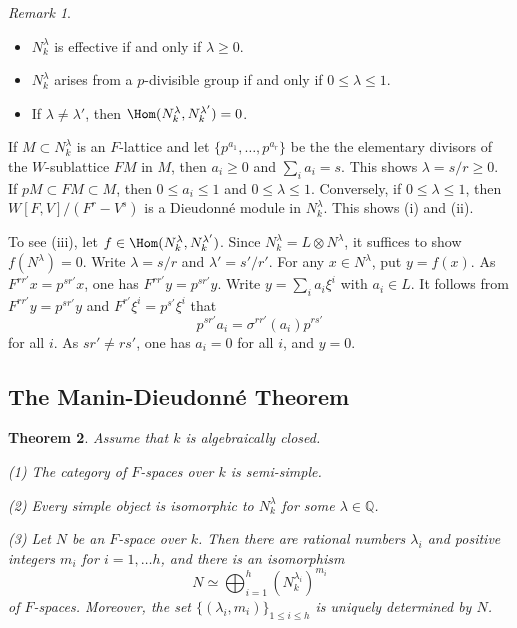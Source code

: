 \documentclass[]{amsart}
\theoremstyle{plain}
\newtheorem{thm}{Theorem}
\theoremstyle{definition}
\theoremstyle{remark}
\newtheorem{remark}[thm]{Remark}
\newcommand{\Q}{\mathbb Q}
\newcommand{\<}{\langle}   %
\renewcommand{\>}{\rangle} %
\newcommand{\dieu}{Dieudonn\'{e} }
\begin{document}
\begin{remark}\label{rem:26} \ 

\begin{itemize}
    \item[(i)] $N^\lambda_k$ is effective if and only if $\lambda\ge 0$.
    \item[(ii)] $N^\lambda_k$ arises from a $p$-divisible group if and only if $0\le \lambda \le 1$.
    \item[(iii)] If $\lambda\neq \lambda'$, then $\Hom(N^\lambda_k, N^{\lambda'}_k)=0$.    
\end{itemize}
If $M\subset N^\lambda_k$ is an $F$-lattice and let $\{p^{a_1}, \dots, p^{a_r}\}$ be the the elementary divisors of the $W$-sublattice $FM$ in $M$, then $a_i\ge 0$ and $\sum_i a_i=s$. This shows $\lambda=s/r \ge 0$. If $pM \subset FM\subset M$, then $0\le a_i\le 1$ and $0\le \lambda \le 1$. Conversely, if $0\le \lambda \le 1$, then $W[F,V]/(F^r-V^s)$ is a \dieu module in $N^\lambda_k$. This shows (i) and (ii).

To see (iii), let $f\in \Hom(N^\lambda_k,N^{\lambda'}_k)$. Since $N^\lambda_k=L\otimes N^\lambda$, it suffices to show $f(N^\lambda)=0$. Write $\lambda=s/r$ and $\lambda'=s'/r'$. For any $x\in N^\lambda$, put $y=f(x)$. As $F^{rr'} x=p^{sr'}x$, one has $F^{rr'}y=p^{sr'} y$. 
Write $y=\sum_i a_i \xi^i$ with $a_i\in L$. It follows from $F^{rr'}y=p^{sr'} y$ and $F^{r'} \xi^i=p^{s'} \xi^i$ that
\[ p^{sr'} a_i=\sigma^{rr'}(a_i) p^{rs'} \] 
for all $i$. As $sr'\neq rs'$, one has $a_i=0$ for all $i$, and $y=0$.   
\end{remark} 

\subsection{The Manin-\dieu Theorem}\label{sec:4.3}

\begin{thm} \label{thm:manin} Assume that $k$ is algebraically closed.  

{\rm (1)} The category of $F$-spaces over $k$ is semi-simple. 

{\rm (2)} Every simple object is isomorphic to $N^\lambda_k$ for some $\lambda\in\Q$.

{\rm (3)} Let $N$ be an $F$-space over $k$. Then there are rational numbers $\lambda_i$ and positive integers $m_i$ for $i=1,\dots h$, and there is an isomorphism 
\[ N\simeq \bigoplus_{i=1}^h (N^{\lambda_i}_k)^{m_i} \]
of $F$-spaces. Moreover, the set $\{(\lambda_i,m_i)\}_{1\le i\le h}$
is uniquely determined by $N$.   
\end{thm}
\end{document}
